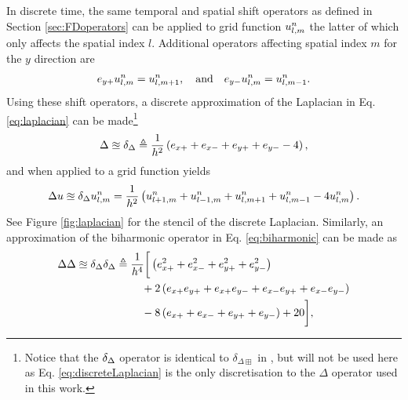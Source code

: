In discrete time, the same temporal and spatial shift operators as defined in Section \ref{sec:FDoperators} can be applied to grid function $u_{l,m}^n$ the latter of which only affects the spatial index $l$. Additional operators affecting spatial index $m$ for the $y$ direction are
\begin{equation}
    e_{y+}u_{l,m}^n = u_{l, m+1}^n,\quad \text{and}\quad e_{y-}u_{l,m}^n= u_{l, m-1}^n.
\end{equation}
Using these shift operators, a discrete approximation of the Laplacian in Eq. \eqref{eq:laplacian} can be made\footnote{Notice that the $\delta_{\Delta}$ operator is identical to $\delta_{\Delta \boxplus}$ in \cite{theBible}, but will not be used here as Eq. \eqref{eq:discreteLaplacian} is the only discretisation to the $\Delta$ operator used in this work.} 
\begin{equation}\label{eq:discreteLaplacian}
    \Delta \approxeq \delta_{\Delta} \triangleq \frac{1}{h^2}\left(e_{x+} + e_{x-} + e_{y+} + e_{y-} - 4\right),
\end{equation}
and when applied to a grid function yields
\begin{equation}\label{eq:laplacianExpansion}
    \Delta u \approxeq \delta_{\Delta} u_{l,m}^n = \frac{1}{h^2}\left(u_{l+1, m}^n + u_{l-1, m}^n+u_{l, m+1}^n+u_{l, m-1}^n - 4 u_{l,m}^n\right). 
\end{equation}
See Figure \ref{fig:laplacian} for the stencil of the discrete Laplacian. Similarly, an approximation of the biharmonic operator in Eq. \eqref{eq:biharmonic} can be made as
\begin{equation}\label{eq:discreteBiharmonic}
        \Delta\Delta \approxeq \delta_{\Delta}\delta_{\Delta} 
        \triangleq \begin{aligned}[t]
        &\frac{1}{h^4}\bigg[\left(e_{x+}^2 + e_{x-}^2 + e_{y+}^2 + e_{y-}^2\right) \\
        &\ \ \ + 2 \left(e_{x+}e_{y+} + e_{x+}e_{y-} + e_{x-}e_{y+} + e_{x-}e_{y-}\right) \\
        &\ \ \ -8 \left(e_{x+} + e_{x-} + e_{y+} + e_{y-}\right) + 20\bigg],
    \end{aligned}
\end{equation}
